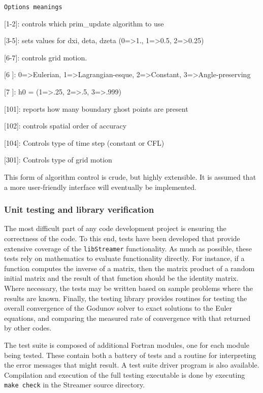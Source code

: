 {\tt Options meanings                                                               

 [1-2]: controls which prim\_update algorithm to use                            

 [3-5]: sets values for dxi, deta, dzeta (0=>1., 1=>0.5, 2=>0.25)              

 [6-7]: controls grid motion.                                                  

 [6  ]: 0=>Eulerian, 1=>Lagrangian-esque, 2=>Constant, 3=>Angle-preserving         

 [7  ]: h0 = (1=>.25, 2=>.5, 3=>.999)                                              

 [101]: reports how many boundary ghost points are present                     

 [102]: controls spatial order of accuracy                                     

 [104]: Controls type of time step (constant or CFL)                           

 [301]: Controls type of grid motion                                           

}

This form of algorithm control is crude, but highly extensible. It is assumed that a more user-friendly interface will eventually be implemented.

\subsubsection{Unit testing and library verification}

The most difficult part of any code development project is ensuring the correctness of the code. To this end, tests have been developed that provide extensive coverage of the {\tt libStreamer} functionality. As much as possible, these tests rely on mathematics to evaluate functionality directly. For instance, if a function computes the inverse of a matrix, then the matrix product of a random initial matrix and the result of that function should be the identity matrix. Where necessary, the tests may be written based on sample problems where the results are known. Finally, the testing library provides routines for testing the overall convergence of the Godunov solver to exact solutions to the Euler equations, and comparing the measured rate of convergence with that returned by other codes.

The test suite is composed of additional Fortran modules, one for each module being tested. These contain both a battery of tests and a routine for interpreting the error messages that might result. A test suite driver program is also available. Compilation and execution of the full testing executable is done by executing {\tt make check} in the Streamer source directory.


